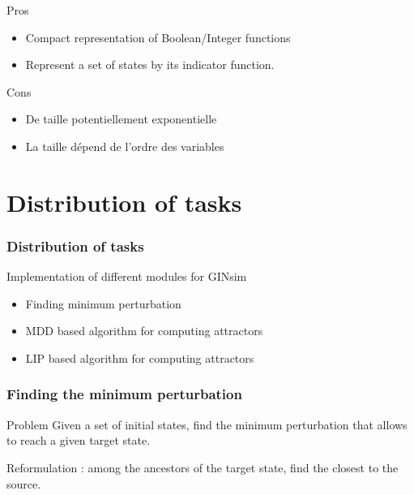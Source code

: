 \documentclass{beamer}
\begin{document}
\begin{frame}
  \begin{block}{Pros}
    \begin{itemize}
    \item Compact representation of Boolean/Integer functions
    \item Represent a set of states by its indicator function.
    \end{itemize}
  \end{block}
  
  \bigskip
  \begin{block}{Cons}
    \begin{itemize}
    \item De taille potentiellement exponentielle
    \item La taille dépend de l'ordre des variables
    \end{itemize}
  \end{block}
\end{frame}



\section{Distribution of tasks}

\begin{frame}
  \frametitle{Distribution of tasks} 
  Implementation of different modules for GINsim
  
  \begin{itemize}
  \item Finding minimum perturbation
    \bigskip
    
  \item MDD based algorithm for computing attractors
    \bigskip
    
  \item LIP based algorithm for computing attractors
  \end{itemize}
\end{frame}

\begin{frame}
  \frametitle{Finding the minimum perturbation}
  \begin{block}{Problem}
    Given a set of initial states, find the minimum perturbation that allows to reach a given target state.
    
    Reformulation : among the ancestors of the target state, find the closest to the source.
  \end{block}
\end{frame}
\end{document}
